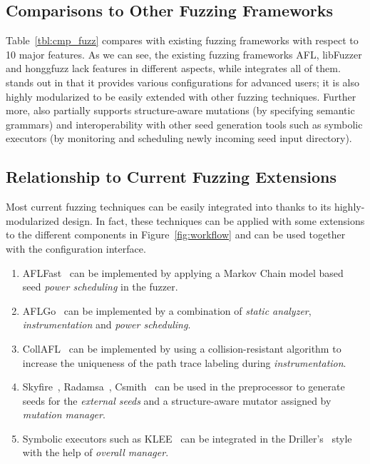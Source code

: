 \subsection{Comparisons to Other Fuzzing Frameworks}

Table~\ref{tbl:cmp_fuzz} compares {\FOT} with existing fuzzing frameworks with respect to 10 major features. As we can see, the existing fuzzing frameworks AFL, libFuzzer and honggfuzz lack features in different aspects, while {\FOT} integrates all of them. {\FOT} stands out in that it provides various configurations for advanced users; it is also highly modularized to be easily extended with other fuzzing techniques. Further more, {\FOT} also partially supports structure-aware mutations (by specifying semantic grammars) and interoperability with other seed generation tools such as symbolic executors (by monitoring and scheduling newly incoming seed input directory). 
\subsection{Relationship to Current Fuzzing Extensions}

Most current fuzzing techniques can be easily integrated into {\FOT} thanks to its highly-modularized design. In fact, these techniques can be applied with some extensions to the different components in Figure~\ref{fig:workflow} and can be used together with the configuration interface. 

\begin{enumerate}[1)]
	\item AFLFast~\cite{Bohme:2016:CGF} can be implemented by applying a Markov Chain model based seed \emph{power scheduling} in the fuzzer. 
	\item AFLGo~\cite{Bohme:2017:DGF} can be implemented by a combination of \emph{static analyzer}, \emph{instrumentation} and \emph{power scheduling}.
	\item CollAFL~\cite{collafl} can be implemented by using a collision-resistant algorithm to increase the uniqueness of the path trace labeling during \emph{instrumentation}.
	\item Skyfire~\cite{junjie:2017sp:skyfire}, Radamsa~\cite{radamsa}, Csmith~\cite{csmith} can be used in the preprocessor to generate seeds for the \emph{external seeds} and a structure-aware mutator assigned by \emph{mutation manager}.
	\item Symbolic executors such as KLEE~\cite{klee} can be integrated in the Driller's~\cite{driller} style with the help of \emph{overall manager}.
\end{enumerate}

